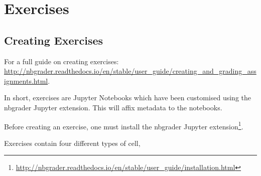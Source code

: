 \section{Exercises}

    \subsection{Creating Exercises}
    
    For a full guide on creating exercises: \url{http://nbgrader.readthedocs.io/en/stable/user_guide/creating_and_grading_assignments.html}.
    
    In short, exercises are Jupyter Notebooks which have been customised using the nbgrader Jupyter extension. This will affix metadata to the notebooks.
    
    Before creating an exercise, one must install the nbgrader Jupyter extension\footnote{\url{http://nbgrader.readthedocs.io/en/stable/user_guide/installation.html}}.
    
    Exercises contain four different types of cell,
    
